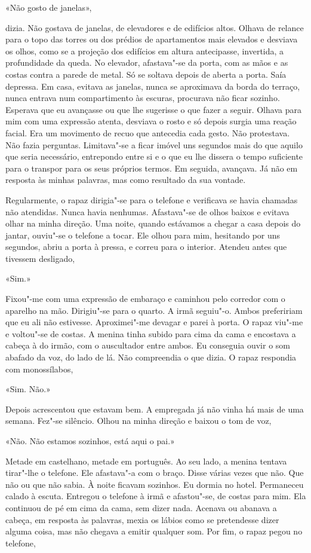 «Não gosto de janelas»,

dizia. Não gostava de janelas, de elevadores e de edifícios altos.
Olhava de relance para o topo das torres ou dos prédios de apartamentos
mais elevados e desviava os olhos, como se a projeção dos edifícios em
altura antecipasse, invertida, a profundidade da queda. No elevador,
afastava"-se da porta, com as mãos e as costas contra a parede de metal.
Só se soltava depois de aberta a porta. Saía depressa. Em casa, evitava
as janelas, nunca se aproximava da borda do terraço, nunca entrava num
compartimento às escuras, procurava não ficar sozinho. Esperava que eu
avançasse ou que lhe sugerisse o que fazer a seguir. Olhava para mim com
uma expressão atenta, desviava o rosto e só depois surgia uma reação
facial. Era um movimento de recuo que antecedia cada gesto. Não
protestava. Não fazia perguntas. Limitava"-se a ficar imóvel uns
segundos mais do que aquilo que seria necessário, entrepondo entre si e
o que eu lhe dissera o tempo suficiente para o transpor para os seus
próprios termos. Em seguida, avançava. Já não em resposta às minhas
palavras, mas como resultado da sua vontade.

Regularmente, o rapaz dirigia"-se para o telefone e verificava se havia
chamadas não atendidas. Nunca havia nenhumas. Afastava"-se de olhos
baixos e evitava olhar na minha direção. Uma noite, quando estávamos a
chegar a casa depois do jantar, ouviu"-se o telefone a tocar. Ele olhou
para mim, hesitando por uns segundos, abriu a porta à pressa, e correu
para o interior. Atendeu antes que tivessem desligado,

«Sim.»

Fixou"-me com uma expressão de embaraço e caminhou pelo corredor com o
aparelho na mão. Dirigiu"-se para o quarto. A irmã seguiu"-o. Ambos
prefeririam que eu ali não estivesse. Aproximei"-me devagar e parei à
porta. O rapaz viu"-me e voltou"-se de costas. A menina tinha subido
para cima da cama e encostava a cabeça à do irmão, com o auscultador
entre ambos. Eu conseguia ouvir o som abafado da voz, do lado de lá. Não
compreendia o que dizia. O rapaz respondia com monossílabos,

«Sim. Não.»

Depois acrescentou que estavam bem. A empregada já não vinha há mais de
uma semana. Fez"-se silêncio. Olhou na minha direção e baixou o tom de
voz,

«Não. Não estamos sozinhos, está aqui o pai.»

Metade em castelhano, metade em português. Ao seu lado, a menina tentava
tirar"-lhe o telefone. Ele afastava"-a com o braço. Disse várias vezes
que não. Que não ou que não sabia. À noite ficavam sozinhos. Eu dormia
no hotel. Permaneceu calado à escuta. Entregou o telefone à irmã e
afastou"-se, de costas para mim. Ela continuou de pé em cima da cama,
sem dizer nada. Acenava ou abanava a cabeça, em resposta às palavras,
mexia os lábios como se pretendesse dizer alguma coisa, mas não chegava
a emitir qualquer som. Por fim, o rapaz pegou no telefone,

